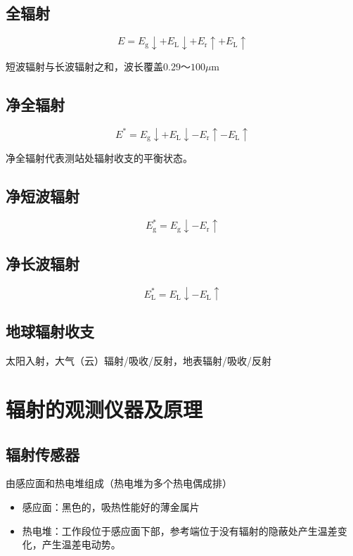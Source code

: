 \documentclass[UTF8,11pt]{ctexbook}
\begin{document}
\subsection{全辐射}
\[
E=E_\mathrm{g}\downarrow+E_\mathrm{L}\downarrow+E_\mathrm{r}\uparrow+E_\mathrm{L}\uparrow
\]

短波辐射与长波辐射之和，波长覆盖0.29～\(100\mu\mathrm{m}\)

\subsection{净全辐射}
\[
E^*=E_\mathrm{g}\downarrow+E_\mathrm{L}\downarrow-E_\mathrm{r}\uparrow-E_\mathrm{L}\uparrow
\]

净全辐射代表测站处辐射收支的平衡状态。

\subsection{净短波辐射}
\[
E_\mathrm{g}^*=E_\mathrm{g}\downarrow-E_\mathrm{r}\uparrow
\]

\subsection{净长波辐射}
\[
E_\mathrm{L}^*=E_\mathrm{L}\downarrow-E_\mathrm{L}\uparrow
\]

\subsection{地球辐射收支}

太阳入射，大气（云）辐射/吸收/反射，地表辐射/吸收/反射

\section{辐射的观测仪器及原理}

\subsection{辐射传感器}

由感应面和热电堆组成（热电堆为多个热电偶成排）
\begin{itemize}
    \item 感应面：黑色的，吸热性能好的薄金属片
    \item 热电堆：工作段位于感应面下部，参考端位于没有辐射的隐蔽处产生温差变化，产生温差电动势。
\end{itemize}
\end{document}
